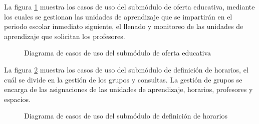 La figura \ref{fig:ofertaEducativa} muestra los casos de uso del submódulo de oferta educativa, mediante los cuales se gestionan las unidades de aprendizaje que se impartirán en el periodo escolar inmediato siguiente, el llenado y monitoreo de las unidades de aprendizaje que solicitan los profesores.

\begin{figure}[htbp]
	\begin{center}
		\caption{Diagrama de casos de uso del submódulo de oferta educativa}
		\label{fig:ofertaEducativa}
	\end{center}
\end{figure}

La figura \ref{fig:definicionHorarios} muestra los casos de uso del submódulo de definición de horarios, el cuál se divide en la gestión de los grupos y consultas. La gestión de grupos se encarga de las asignaciones de las unidades de aprendizaje, horarios, profesores y espacios.

\begin{figure}[htbp]
	\begin{center}
		\caption{Diagrama de casos de uso del submódulo de definición de horarios}
		\label{fig:definicionHorarios}
	\end{center}
\end{figure}

